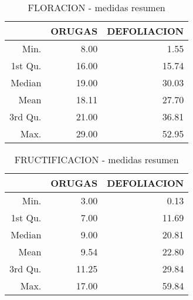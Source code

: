 \begin{table}[ht]
\centering
\begin{tabular}{rrr}
  \hline
 & ORUGAS & DEFOLIACION \\ 
  \hline
Min. & 8.00 & 1.55 \\ 
  1st Qu. & 16.00 & 15.74 \\ 
  Median & 19.00 & 30.03 \\ 
  Mean & 18.11 & 27.70 \\ 
  3rd Qu. & 21.00 & 36.81 \\ 
  Max. & 29.00 & 52.95 \\ 
   \hline
\end{tabular}
\caption{FLORACION - medidas resumen} 
\label{table:dfSummary_flora}
\end{table}
\begin{table}[ht]
\centering
\begin{tabular}{rrr}
  \hline
 & ORUGAS & DEFOLIACION \\ 
  \hline
Min. & 3.00 & 0.13 \\ 
  1st Qu. & 7.00 & 11.69 \\ 
  Median & 9.00 & 20.81 \\ 
  Mean & 9.54 & 22.80 \\ 
  3rd Qu. & 11.25 & 29.84 \\ 
  Max. & 17.00 & 59.84 \\ 
   \hline
\end{tabular}
\caption{FRUCTIFICACION - medidas resumen} 
\label{table:dfSummary_fruct}
\end{table}
